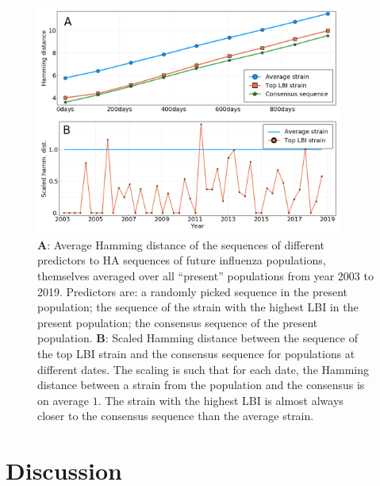 \documentclass[reprint,amsmath,amssymb,superscriptaddress,showpacs,rmp]{revtex4-1}
\begin{document}
\begin{figure}
	\centering
	\includegraphics[width=0.9\textwidth]{./Figures/Panel4.png}
	\caption{\textbf{A}: Average Hamming distance of the sequences of different predictors to HA sequences of future influenza populations, themselves averaged over all ``present'' populations from year 2003 to 2019. Predictors are: a randomly picked sequence in the present population; the sequence of the strain with the highest LBI in the present population; the consensus sequence of the present population. \textbf{B}: Scaled Hamming distance between the sequence of the top LBI strain and the consensus sequence for populations at different dates. The scaling is such that for each date, the Hamming distance between a strain from the population and the consensus is on average $1$. The strain with the highest LBI is almost always closer to the consensus sequence than the average strain.}
	\label{fig:LBI_consensus}
\end{figure}


\section*{Discussion} %
\label{sec:discussion}
\end{document}
